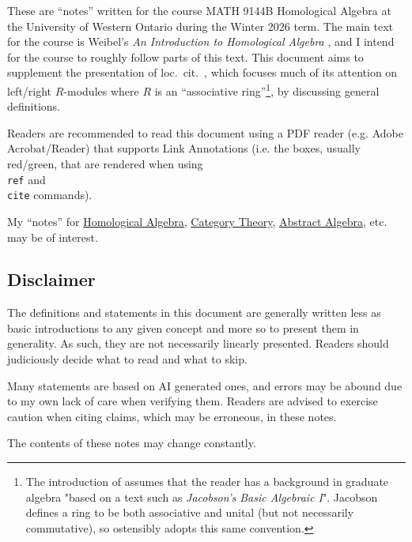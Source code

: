 \nocite{*}

These are ``notes'' written for the course MATH 9144B Homological Algebra at the University of Western Ontario during the Winter 2026 term. The main text for the course is Weibel's \emph{An Introduction to Homological Algebra} \cite{weibel}, and I intend for the course to roughly follow parts of this text. This document aims to supplement the presentation of loc.~cit.~, which focuses much of its attention on left/right $R$-modules where $R$ is an ``associative ring''\footnote{The introduction of \cite{weibel} assumes that the reader has a background in graduate algebra "based on a text such as \emph{Jacobson's Basic Algebraic I}". Jacobson defines a ring to be both associative and unital (but not necessarily commutative), so ostensibly \cite{weibel} adopts this same convention.}, by discussing general definitions. 

Readers are recommended to read this document using a PDF reader (e.g. Adobe Acrobat/Reader) that supports Link Annotations (i.e. the boxes, usually red/green, that are rendered when using \texttt{\\ref} and \texttt{\\cite} commands).

My ``notes'' for \href{https://github.com/hyunjongkimmath/_writing/tree/main/HomologicalAlgebra}{Homological Algebra}, \href{https://github.com/hyunjongkimmath/_writing/tree/main/CategoryTheory}{Category Theory}, \href{https://github.com/hyunjongkimmath/_writing/tree/main/AbstractAlgebra}{Abstract Algebra}, etc. may be of interest.

\subsection{Disclaimer}

The definitions and statements in this document are generally written less as basic introductions to any given concept and more so to present them in generality. As such, they are not necessarily linearly presented. Readers should judiciously decide what to read and what to skip.

Many statements are based on AI generated ones, and errors may be abound due to my own lack of care when verifying them. Readers are advised to exercise caution when citing claims, which may be erroneous, in these notes.

The contents of these notes may change constantly.

